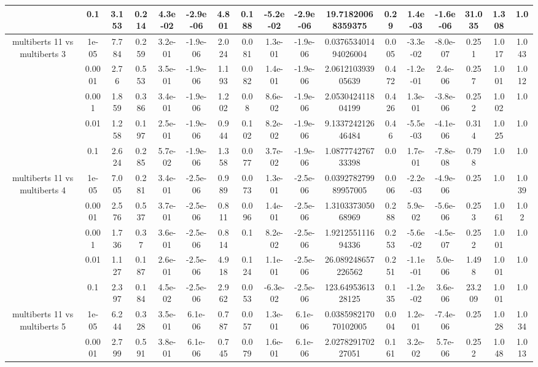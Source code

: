 \begin{tabular}{|c|c|c|c|c|c|c|c|c|c|c|c|c|c|c|c|c|}
 & 0.1 & 3.153 & 0.214 & 4.3e-02 & -2.9e-06 & 4.801 & 0.188 & -5.2e-02 & -2.9e-06 & 19.71820068359375 & 0.29 & 1.4e-03 & -1.6e-06 & 31.035 & 1.308 & 1.0 \\
\hline
\multirow{5}{*}{multiberts 11 vs multiberts 3} & 1e-05 & 7.784 & 0.259 & 3.2e-01 & -1.9e-06 & 2.024 & 0.081 & 1.3e-01 & -1.9e-06 & 0.037653401494026004 & 0.005 & -3.3e-02 & -8.0e-07 & 0.251 & 1.017 & 1.043 \\
 & 0.0001 & 2.76 & 0.553 & 3.5e-01 & -1.9e-06 & 1.193 & 0.082 & 1.4e-01 & -1.9e-06 & 2.061210393905639 & 0.472 & -1.2e-01 & 2.4e-06 & 0.257 & 1.001 & 1.012 \\
 & 0.001 & 1.859 & 0.386 & 3.4e-01 & -1.9e-06 & 1.202 & 0.08 & 8.6e-02 & -1.9e-06 & 2.053042411804199 & 0.426 & 1.3e-01 & -3.8e-06 & 0.252 & 1.002 & 1.0 \\
 & 0.01 & 1.258 & 0.197 & 2.5e-01 & -1.9e-06 & 0.944 & 0.102 & 8.2e-02 & -1.9e-06 & 9.133724212646484 & 0.46 & -5.5e-03 & -4.1e-06 & 0.314 & 1.025 & 1.0 \\
 & 0.1 & 2.624 & 0.285 & 5.7e-02 & -1.9e-06 & 1.358 & 0.077 & 3.7e-02 & -1.9e-06 & 1.087774276733398 & 0.0 & 1.7e-01 & -7.8e-08 & 0.798 & 1.0 & 1.0 \\
\hline
\multirow{5}{*}{multiberts 11 vs multiberts 4} & 1e-05 & 7.005 & 0.281 & 3.4e-01 & -2.5e-06 & 0.989 & 0.073 & 1.3e-01 & -2.5e-06 & 0.039278279989957005 & 0.006 & -2.2e-03 & -4.9e-06 & 0.25 & 1.0 & 1.039 \\
 & 0.0001 & 2.576 & 0.537 & 3.7e-01 & -2.5e-06 & 0.811 & 0.096 & 1.4e-01 & -2.5e-06 & 1.310337305068969 & 0.288 & 5.9e-02 & -5.6e-06 & 0.253 & 1.061 & 1.02 \\
 & 0.001 & 1.736 & 0.37 & 3.6e-01 & -2.5e-06 & 0.814 & 0.1 & 8.2e-02 & -2.5e-06 & 1.921255111694336 & 0.253 & -5.6e-02 & -4.5e-07 & 0.252 & 1.001 & 1.0 \\
 & 0.01 & 1.127 & 0.187 & 2.6e-01 & -2.5e-06 & 4.918 & 0.124 & 1.1e-01 & -2.5e-06 & 26.089248657226562 & 0.251 & -1.1e-01 & 5.0e-06 & 1.498 & 1.001 & 1.0 \\
 & 0.1 & 2.397 & 0.184 & 4.5e-02 & -2.5e-06 & 2.962 & 0.053 & -6.3e-02 & -2.5e-06 & 123.6495361328125 & 0.135 & -1.2e-02 & 3.6e-06 & 23.209 & 1.001 & 1.0 \\
\hline
\multirow{5}{*}{multiberts 11 vs multiberts 5} & 1e-05 & 6.244 & 0.328 & 3.5e-01 & 6.1e-06 & 0.787 & 0.057 & 1.3e-01 & 6.1e-06 & 0.038598217070102005 & 0.004 & 1.2e-01 & -7.4e-06 & 0.25 & 1.028 & 1.034 \\
 & 0.0001 & 2.799 & 0.591 & 3.8e-01 & 6.1e-06 & 0.745 & 0.079 & 1.6e-01 & 6.1e-06 & 2.027829170227051 & 0.161 & 3.2e-02 & 5.7e-06 & 0.252 & 1.048 & 1.013 \\

\end{tabular}
